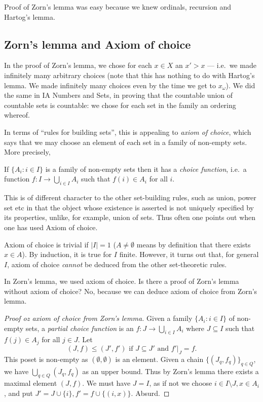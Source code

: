 \documentclass[a4paper]{article}
\begin{document}
\begin{remark}
  Proof of Zorn's lemma was easy because we knew ordinals, recursion  and Hartog's lemma.
\end{remark}

\subsection{Zorn's lemma and Axiom of choice}

In the proof of Zorn's lemma, we chose for each \(x \in X\) an \(x' > x\) --- i.e.\ we made infinitely many arbitrary choices (note that this has nothing to do with Hartog's lemma. We made infinitely many choices even by the time we get to \(x_\omega\)). We did the same in IA Numbers and Sets, in proving that the countable union of countable sets is countable: we chose for each set in the family an ordering whereof.

In terms of ``rules for building sets'', this is appealing to \emph{axiom of choice}, which says that we may choose an element of each set in a family of non-empty sets. More precisely,

\begin{theorem}
  If \(\{A_i: i \in I\}\) is a family of non-empty sets then it has a \emph{choice function}, i.e.\ a function \(f: I \to \bigcup_{i \in I} A_i\) such that \(f(i) \in A_i\) for all \(i\).
\end{theorem}

This is of different character to the other set-building rules, such as union, power set etc in that the object whose existence is asserted is not uniquely specified by its properties, unlike, for example, union of sets. Thus often one points out when one has used Axiom of choice.

\begin{remark}
  Axiom of choice is trivial if \(|I| = 1\) (\(A \neq \emptyset\) means by definition that there exists \(x \in A\)). By induction, it is true for \(I\) finite. However, it turns out that, for general \(I\), axiom of choice \emph{cannot} be deduced from the other set-theoretic rules.
\end{remark}

In Zorn's lemma, we used axiom of choice. Is there a proof of Zorn's lemma without axiom of choice? No, because we can deduce axiom of choice from Zorn's lemma.

\begin{proof}[Proof oz axiom of choice from Zorn's lemma]
  Given a family \(\{A_i: i \in I\}\) of non-empty sets, a \emph{partial choice function} is an \(f: J \to \bigcup_{i \in I} A_i\) where \(J \subseteq I\) such that \(f(j) \in A_j\) for all \(j \in J\). Let
  \[
    (J, f) \leq (J', f') \text{ if } J \subseteq J' \text{ and } f'|_J = f.
  \]
  This poset is non-empty as \((\emptyset, \emptyset)\) is an element. Given a chain \(\{(J_q, f_q)\}_{q \in Q}\), we have \(\bigcup_{q \in Q} (J_q, f_q)\) as an upper bound. Thus by Zorn's lemma there exists a maximal element \((J, f)\). We must have \(J = I\), as if not we choose \(i \in I \setminus J, x \in A_i\), and put \(J' = J \cup \{i\}, f' = f \cup \{(i, x)\}\). Absurd.
\end{proof}
\end{document}
